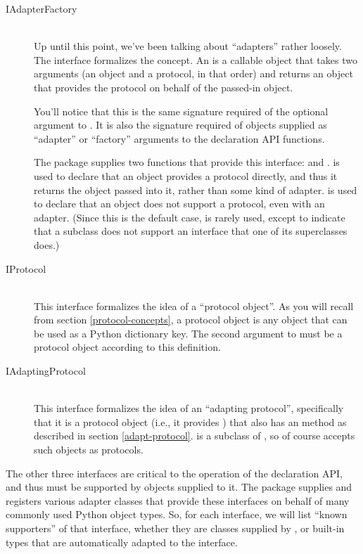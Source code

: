 \begin{verbatim%
}
\begin{verbatim%
}
\begin{verbatim%
}
\begin{verbatim%
}
\begin{description}

\item[IAdapterFactory] \hfill \\
Up until this point, we've been talking about ``adapters'' rather loosely.  The
 interface formalizes the concept.  An  is a callable object that takes two arguments (an object and a
protocol, in that order) and returns an object that provides the protocol on
behalf of the passed-in object.

You'll notice that this is the same signature required of the optional
 argument to .  It is also the signature required
of objects supplied as ``adapter'' or ``factory'' arguments to the declaration
API functions.

The  package supplies two functions that provide
this interface:  and .
 is used to declare that an object provides a
protocol directly, and thus it returns the object passed into it, rather than
some kind of adapter.   is used to declare that an
object does not support a protocol, even with an adapter.  (Since this is the
default case,  is rarely used, except to indicate
that a subclass does not support an interface that one of its superclasses
does.)

\item[IProtocol] \hfill \\
This interface formalizes the idea of a ``protocol object''.  As you will
recall from section \ref{protocol-concepts}, a protocol object is any object
that can be used as a Python dictionary key.  The second argument to
 must be a protocol object according to this definition.


\item[IAdaptingProtocol] \hfill \\
This interface formalizes the idea of an ``adapting protocol'', specifically
that it is a protocol object (i.e., it provides ) that also
has an  method as described in section \ref{adapt-protocol}.
 is a subclass of , so of course
 accepts such objects as protocols.

\end{description}

The other three interfaces are critical to the operation of the declaration API,
and thus must be supported by objects supplied to it.  The 
package supplies and registers various adapter classes that provide these
interfaces on behalf of many commonly used Python object types.  So, for each
interface, we will list ``known supporters'' of that interface, whether they
are classes supplied by , or built-in types that are
automatically adapted to the interface.


\end{verbatim%
}
\end{verbatim%
}
\end{verbatim%
}
\end{verbatim%
}
